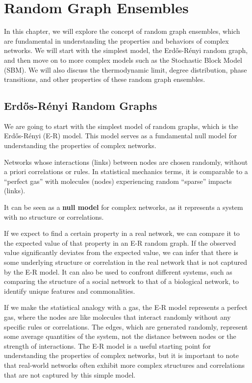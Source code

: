 \chapter{Random Graph Ensembles}

In this chapter, we will explore the concept of random graph ensembles, which are fundamental in understanding the properties and behaviors of complex networks. We will start with the simplest model, the Erdős-Rényi random graph, and then move on to more complex models such as the Stochastic Block Model (SBM). We will also discuss the thermodynamic limit, degree distribution, phase transitions, and other properties of these random graph ensembles.

\section{Erdős-Rényi Random Graphs}

We are going to start with the simplest model of random graphs, which is the Erdős-Rényi (E-R) model. This model serves as a fundamental null model for understanding the properties of complex networks.

\begin{definition}
    Networks whose interactions (links) between nodes are chosen randomly, without a priori correlations or rules. In statistical mechanics terms, it is comparable to a ``perfect gas'' with molecules (nodes) experiencing random ``sparse'' impacts (links).
\end{definition}
It can be seen as a \textbf{null model} for complex networks, as it represents a system with no structure or correlations.

If we expect to find a certain property in a real network, we can compare it to the expected value of that property in an E-R random graph. If the observed value significantly deviates from the expected value, we can infer that there is some underlying structure or correlation in the real network that is not captured by the E-R model. It can also be used to confront different systems, such as comparing the structure of a social network to that of a biological network, to identify unique features and commonalities.

If we make the statistical analogy with a gas, the E-R model represents a perfect gas, where the nodes are like molecules that interact randomly without any specific rules or correlations. The edges, which are generated randomly, represent some average quantities of the system, not the distance between nodes or the strength of interactions. The E-R model is a useful starting point for understanding the properties of complex networks, but it is important to note that real-world networks often exhibit more complex structures and correlations that are not captured by this simple model.

